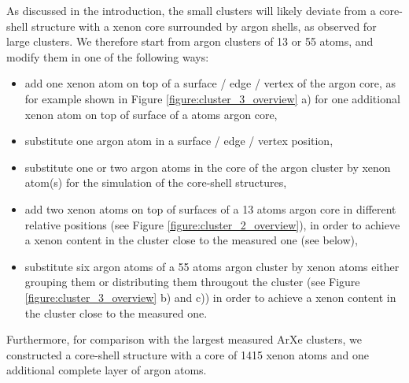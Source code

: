 As discussed in the introduction, the small clusters will likely
deviate from a core-shell structure with a xenon core surrounded
by argon shells, as observed for large clusters.\cite{tchaplyguinearxe,Vach_1999} We therefore start from
argon clusters of 13 or 55 atoms, and modify them in one of the following
ways:
%
\begin{itemize}
 \item add one xenon atom on top of a surface / edge / vertex of
       the argon core, as for example shown in
       Figure \ref{figure:cluster_3_overview} a)
       for one additional xenon atom
       on top of surface of a \unit[55]{atoms} argon core,
 \item substitute one argon atom in a surface / edge / vertex position,
 \item substitute one or two argon atoms in the core of the argon cluster
       by xenon atom(s) for the simulation of the core-shell structures,
 \item add two xenon atoms on top of surfaces of a 13 atoms argon core
       in different relative positions (see Figure
       \ref{figure:cluster_2_overview}),
       in order to achieve a xenon content in the cluster close to the
       measured one (see below),
 \item substitute six argon atoms of a 55 atoms argon cluster by xenon
       atoms either grouping them or distributing them througout the cluster
       (see Figure \ref{figure:cluster_3_overview} b) and c)) in order to
       achieve a xenon content in the cluster close to the measured one.
\end{itemize}
%
Furthermore, for comparison with the largest measured ArXe clusters, we constructed a core-shell structure with a core of 1415 xenon atoms and one additional complete layer of argon atoms.
